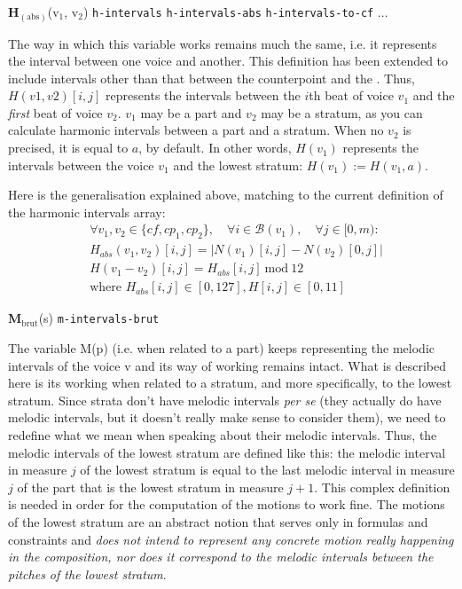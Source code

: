 \vspace{.5cm} \noindent \textbf{H}$_{(\text{abs})}$(v$_1$, v$_2$) \hspace{.2cm} \texttt{h-intervals}\hspace{.2cm} \texttt{h-intervals-abs}\hspace{.2cm} \texttt{h-intervals-to-cf}\hspace{.2cm}  ...

The way in which this variable works remains much the same, i.e. it represents the interval between one voice and another. This definition has been extended to include intervals other than that between the counterpoint and the \cf. Thus, $H(v1,v2)[i,j]$ represents the intervals between the $i$th beat of voice $v_1$ and the \textit{first} beat of voice $v_2$. $v_1$ may be a part and $v_2$ may be a stratum, as you can calculate harmonic intervals between a part and a stratum. When no $v_2$ is precised, it is equal to $a$, by default. In other words, $H(v_1)$ represents the intervals between the voice $v_1$ and the lowest stratum: $H(v_1) := H(v_1,a)$.

Here is the generalisation explained above, matching to the current definition of the harmonic intervals array:
\begin{equation}
\begin{aligned}
    &\forall v_1, v_2 \in \{cf, cp_1, cp_2\}, \quad \forall i \in \mathcal{B}(v_1), \quad \forall j \in [0, m):\\
    &H_{abs}(v_1,v_2)[i, j] = \left|N(v_1)[i, j] - N(v_2)[0,j]\right|\\
    &H(v_1-v_2)[i, j] = H_{abs}[i, j]\ \text{mod}\ 12\\
    &\text{where } H_{abs}[i, j] \in [0, 127], H[i, j] \in [0, 11]
\end{aligned}
\end{equation}

\vspace{.5cm}
\noindent \textbf{M}$_{\text{brut}}$(s) \hspace*{.2cm} \texttt{m-intervals-brut}

The variable M(p) (i.e. when related to a part) keeps representing the melodic intervals of the voice v and its way of working remains intact. What is described here is its working when related to a stratum, and more specifically, to the lowest stratum. Since strata don't have melodic intervals \textit{per se} (they actually do have melodic intervals, but it doesn't really make sense to consider them), we need to redefine what we mean when speaking about their melodic intervals. Thus, the melodic intervals of the lowest stratum are defined like this: the melodic interval in measure $j$ of the lowest stratum is equal to the last melodic interval in measure $j$ of the part that is the lowest stratum in measure $j+1$. This complex definition is needed in order for the computation of the motions to work fine. The motions of the lowest stratum are an abstract notion that serves only in formulas and constraints and \textit{does not intend to represent any concrete motion really happening in the composition, nor does it correspond to the melodic intervals between the pitches of the lowest stratum}.

